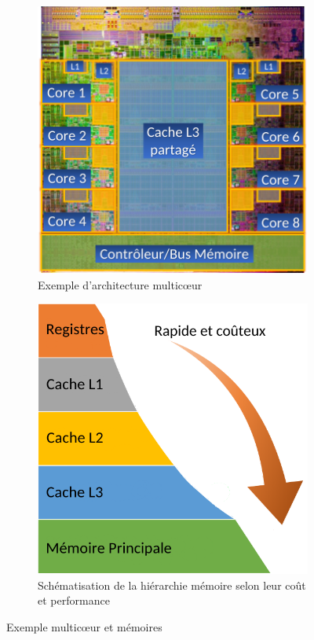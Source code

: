 \documentclass[french, a4paper, 11pt, twoside, pdftex]{StyleThese}
\begin{document}
\begin{figure}[ht]
	\centering
	\begin{subfigure}{.45\textwidth} \centering
		\includegraphics[width=0.9\linewidth]{schemas/multicoeurIntel}
		\caption{Exemple d'architecture multicœur}
		\label{fig:multicoeurintel}
	\end{subfigure}			
	\begin{subfigure}{.45\textwidth} \centering
		\includegraphics[width=0.85\linewidth]{schemas/hierarchieMemoire}
		\caption[Hiérarchie mémoire]{Schématisation de la hiérarchie mémoire selon leur coût et performance}
		\label{fig:hierarchiememoire}
	\end{subfigure}
	\caption{Exemple multicœur et mémoires}
	\label{fig:multicoeurs}
\end{figure}
\end{document}
